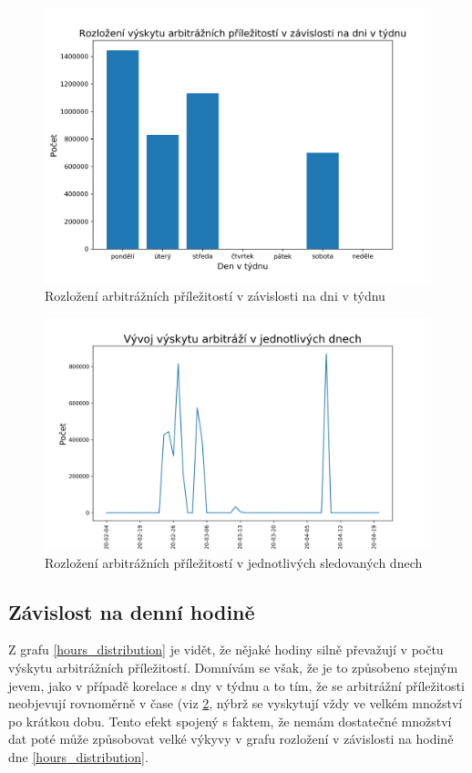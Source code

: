 \documentclass[thesis=B,czech]{FITthesis}[2019/03/21]
\begin{document}
\begin{figure}\centering
	\includegraphics[width=1\textwidth]{images/weekday_distribution.png}
	\caption{Rozložení arbitrážních příležitostí v závislosti na dni v týdnu }\label{weekday_distribution}
\end{figure}
\begin{figure}\centering
	\includegraphics[width=1\textwidth]{images/occurences.png}
	\caption{Rozložení arbitrážních příležitostí v jednotlivých sledovaných dnech}\label{occurences}
\end{figure}
\subsection{Závislost na denní hodině}
Z grafu \ref{hours_distribution} je vidět, že nějaké hodiny silně převažují v počtu výskytu arbitrážních příležitostí. Domnívám se však, že je to způsobeno stejným jevem, jako v případě korelace s dny v týdnu a to tím, že se arbitrážní příležitosti neobjevují rovnoměrně v čase (viz \ref{occurences}, nýbrž se vyskytují vždy ve velkém množství po krátkou dobu. Tento efekt spojený s faktem, že nemám dostatečné množství dat poté může způsobovat velké výkyvy v grafu rozložení v závislosti na hodině dne \ref{hours_distribution}.
\end{document}
